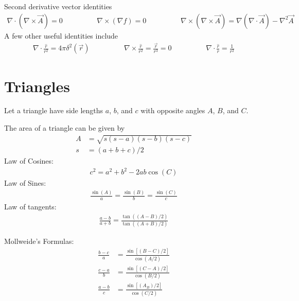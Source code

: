 Second derivative vector identities
\begin{align}
	\nabla \cdot (\nabla \times \vec{A}) =0 \hspace{2cm} \nabla \times (\nabla f)=0 \hspace{2cm}
	\nabla \times (\nabla \times \vec{A}) = \nabla (\nabla \cdot \vec{A})- \nabla^2\vec{A}
\end{align}
A few other useful identities include
\begin{align}
	\nabla \cdot \frac{\hat{r}}{r^2} = 4\pi\delta^2(\vec{r}) \hspace{2cm}\nabla \times \frac{\hat{r}}{r^2} =\frac{\vec{r}}{r^3}= 0 \hspace{2cm} \nabla \cdot \frac{\hat{r}}{r} = \frac{1}{r^2}
\end{align}




\section{Triangles}
Let a triangle have side lengths $a$, $b$, and $c$ with opposite angles $A$, $B$, and $C$. 
\begin{multicols}{2}
The area of a triangle can be given by 
\begin{align}
A&=\sqrt{s(s-a)(s-b)(s-c)} \\
s&=(a+b+c)/2
\end{align}		
Law of Cosines:
\begin{align}
c^2=a^2+b^2-2ab\cos(C)
\end{align}
Law of Sines:
\begin{align}
\frac{\sin(A)}{a}=\frac{\sin(B)}{b}=\frac{\sin(C)}{c}
\end{align}
Law of tangents:
\begin{align}
\frac{a-b}{a+b}=\frac{\tan((A-B)/2)}{\tan((A+B)/2)}
\end{align}
\end{multicols}
Mollweide's Formulas:
\begin{align}
\frac{b-c}{a} &=\frac{\sin[(B-C)/2]}{\cos(A/2)} \\
\frac{c-a}{b} &=\frac{\sin[(C-A)/2]}{\cos(B/2)} \\
\frac{a-b}{c} &=\frac{\sin[(A_B)/2]}{\cos(C/2)}
\end{align}	










